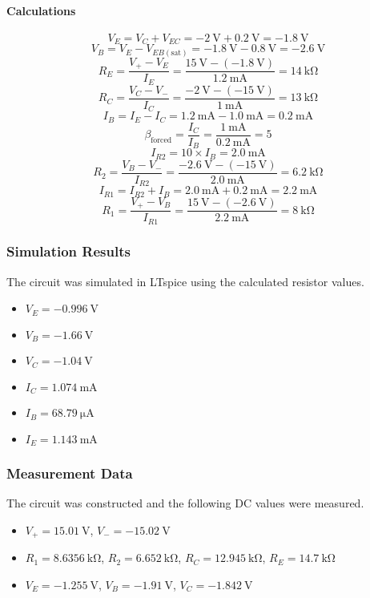 \documentclass[12pt]{article}
\begin{document}
\paragraph{Calculations}
$$
V_E = V_C + V_{EC} = \SI{-2}{\volt} + \SI{0.2}{\volt} = \SI{-1.8}{\volt}
$$
$$
V_B = V_E - V_{EB(\text{sat})} = \SI{-1.8}{\volt} - \SI{0.8}{\volt} = \SI{-2.6}{\volt}
$$
$$
R_E = \frac{V_{+} - V_E}{I_E} = \frac{\SI{15}{\volt} - (\SI{-1.8}{\volt})}{\SI{1.2}{\milli\ampere}} = \SI{14}{\kilo\ohm}
$$
$$
R_C = \frac{V_C - V_{-}}{I_C} = \frac{\SI{-2}{\volt} - (\SI{-15}{\volt})}{\SI{1}{\milli\ampere}} = \SI{13}{\kilo\ohm}
$$
$$
I_B = I_E - I_C = \SI{1.2}{\milli\ampere} - \SI{1.0}{\milli\ampere} = \SI{0.2}{\milli\ampere}
$$
$$
\beta_{\text{forced}} = \frac{I_C}{I_B} = \frac{\SI{1}{\milli\ampere}}{\SI{0.2}{\milli\ampere}} = 5
$$
$$
I_{R2} = 10 \times I_B = \SI{2.0}{\milli\ampere}
$$
$$
R_2 = \frac{V_B - V_{-}}{I_{R2}} = \frac{\SI{-2.6}{\volt} - (\SI{-15}{\volt})}{\SI{2.0}{\milli\ampere}} = \SI{6.2}{\kilo\ohm}
$$
$$
I_{R1} = I_{R2} + I_B = \SI{2.0}{\milli\ampere} + \SI{0.2}{\milli\ampere} = \SI{2.2}{\milli\ampere}
$$
$$
R_1 = \frac{V_{+} - V_B}{I_{R1}} = \frac{\SI{15}{\volt} - (\SI{-2.6}{\volt})}{\SI{2.2}{\milli\ampere}} = \SI{8}{\kilo\ohm}
$$

\subsubsection{Simulation Results}
The circuit was simulated in LTspice using the calculated resistor values.
\begin{itemize}
    \item $V_E = \SI{-0.996}{\volt}$
    \item $V_B = \SI{-1.66}{\volt}$
    \item $V_C = \SI{-1.04}{\volt}$
    \item $I_C = \SI{1.074}{\milli\ampere}$
    \item $I_B = \SI{68.79}{\micro\ampere}$
    \item $I_E = \SI{1.143}{\milli\ampere}$
\end{itemize}

\subsubsection{Measurement Data}
The circuit was constructed and the following DC values were measured.
\begin{itemize}
    \item $V_+ = \SI{15.01}{\volt}$, $V_- = \SI{-15.02}{\volt}$
    \item $R_1 = \SI{8.6356}{\kilo\ohm}$, $R_2 = \SI{6.652}{\kilo\ohm}$, $R_C = \SI{12.945}{\kilo\ohm}$, $R_E = \SI{14.7}{\kilo\ohm}$
    \item $V_E = \SI{-1.255}{\volt}$, $V_B = \SI{-1.91}{\volt}$, $V_C = \SI{-1.842}{\volt}$
\end{itemize}
\end{document}
